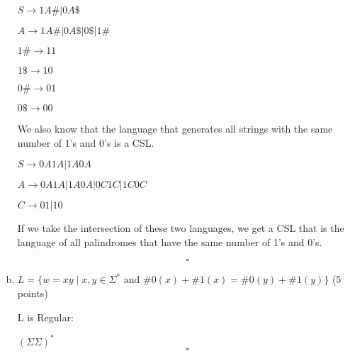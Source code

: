 \documentclass{article}
\begin{document}
\begin{enumerate}[(a)]
$S \rightarrow 1A\# | 0A\$$

$A \rightarrow 1A\# | 0A\$ | 0\$ | 1\#$

$1\# \rightarrow 11$

$1\$ \rightarrow 10$

$0\# \rightarrow 01$

$0\$ \rightarrow 00$

We also know that the language that generates all strings with the same number
of 1's and 0's is a CSL.

$S \rightarrow 0A1A | 1A0A$

$A \rightarrow 0A1A | 1A0A | 0C1C | 1C0C$

$C \rightarrow 01 | 10$

If we take the intersection of these two languages, we get a CSL that is
the language of all palindromes that have the same number of 1's and 0's.

\[ \square \]

            \item $L = \{w=xy \;|\; x,y\in\Sigma^* \text{ and } \#0(x)+\#1(x)=\#0(y)+\#1(y)\}$ (5 points)

            L is Regular:

            $(\Sigma\Sigma)^*$
            \[ \square \]

            \end{enumerate}
            \newpage
\end{document}
